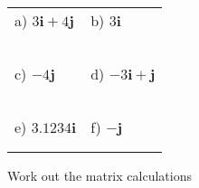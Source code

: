 \documentclass[fontsize=12pt]{scrartcl}
\begin{document}
\begin{tabular}{p{9cm}p{9cm}}
a) $3\mathbf{i}+4\mathbf{j}$
&b) $3\mathbf{i}$
\\\\\\
\\\\\\

c) $-4\mathbf{j}$
&d) $-3\mathbf{i}+\mathbf{j}$
\\\\\\
\\\\\\

e) $3.1234\mathbf{i}$
&f) $-\mathbf{j}$
\\\\\\
\end{tabular}
\newpage
Work out the matrix calculations
\newline
\newline
\end{document}

